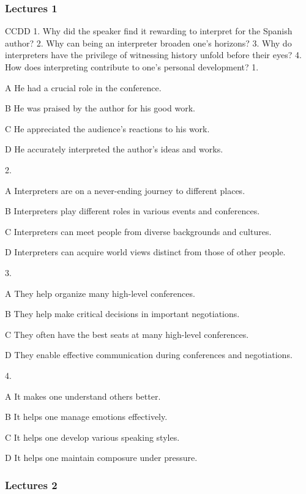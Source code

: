 \subsubsection{Lectures 1}

\begin{enumerate}
	CCDD
	1. Why did the speaker find it rewarding to interpret for the Spanish author?
	2. Why can being an interpreter broaden one's horizons?
	3. Why do interpreters have the privilege of witnessing history unfold before their eyes?
	4. How does interpreting contribute to one's personal development?
	1.
	
	A
	He had a crucial role in the conference.
	
	B
	He was praised by the author for his good work.
	
	C
	He appreciated the audience's reactions to his work.
	
	D
	He accurately interpreted the author's ideas and works.
	
	2.
	
	A
	Interpreters are on a never-ending journey to different places.
	
	B
	Interpreters play different roles in various events and conferences.
	
	C
	Interpreters can meet people from diverse backgrounds and cultures.
	
	D
	Interpreters can acquire world views distinct from those of other people.
	
	3.
	
	A
	They help organize many high-level conferences.
	
	B
	They help make critical decisions in important negotiations.
	
	C
	They often have the best seats at many high-level conferences.
	
	D
	They enable effective communication during conferences and negotiations.
	
	4.
	
	A
	It makes one understand others better.
	
	B
	It helps one manage emotions effectively.
	
	C
	It helps one develop various speaking styles.
	
	D
	It helps one maintain composure under pressure.
\end{enumerate}


\subsubsection{Lectures 2}

